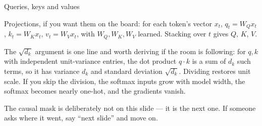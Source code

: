 \documentclass[aspectratio=169,10pt]{beamer}
\begin{document}
\begin{frame}{Queries, keys and values}
{  Projections, if you want them on the board: for each token's vector $x_t$,
  $q_t = W_Q x_t$, $k_t = W_K x_t$, $v_t = W_V x_t$, with $W_Q, W_K, W_V$
  learned. Stacking over $t$ gives $Q$, $K$, $V$.

  The $\sqrt{d_k}$ argument is one line and worth deriving if the room is
  following: for $q, k$ with independent unit-variance entries, the dot
  product $q\cdot k$ is a sum of $d_k$ such terms, so it has variance $d_k$
  and standard deviation $\sqrt{d_k}$. Dividing restores unit scale. If you
  skip the division, the softmax inputs grow with model width, the softmax
  becomes nearly one-hot, and the gradients vanish.

  The causal mask is deliberately not on this slide --- it is the next one.
  If someone asks where it went, say ``next slide'' and move on.}
\end{frame}
\end{document}
